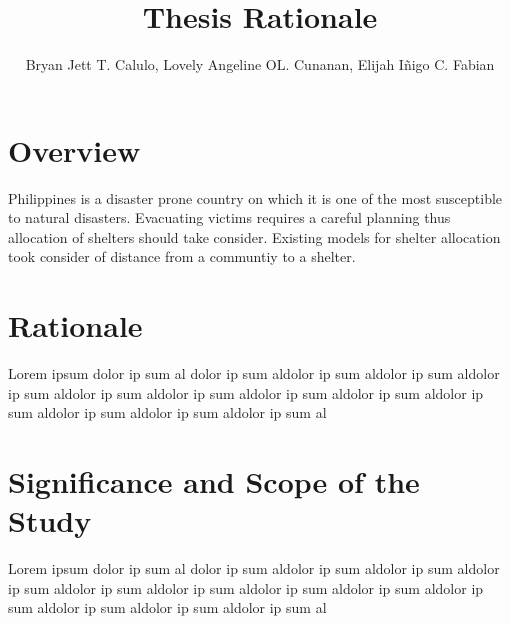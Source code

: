 \documentclass[english,12pt,a4paper]{article}
\title{Thesis Rationale}
\author{Bryan Jett T. Calulo, Lovely Angeline OL. Cunanan, Elijah Iñigo C. Fabian}
\begin{document}
	\maketitle
	
	\section*{Overview}
	Philippines is a disaster prone country on which it is one of the most susceptible to natural disasters. Evacuating victims requires a careful planning thus allocation of shelters should take consider. Existing models for shelter allocation took consider of distance from a communtiy to a shelter. 
	
	\section*{Rationale}
	Lorem ipsum dolor ip sum al dolor ip sum aldolor ip sum aldolor ip sum aldolor ip sum aldolor ip sum aldolor ip sum aldolor ip sum aldolor ip sum aldolor ip sum aldolor ip sum aldolor ip sum aldolor ip sum al
	
	\section*{Significance and Scope of the Study}
	Lorem ipsum dolor ip sum al dolor ip sum aldolor ip sum aldolor ip sum aldolor ip sum aldolor ip sum aldolor ip sum aldolor ip sum aldolor ip sum aldolor ip sum aldolor ip sum aldolor ip sum aldolor ip sum al
	
\end{document}
